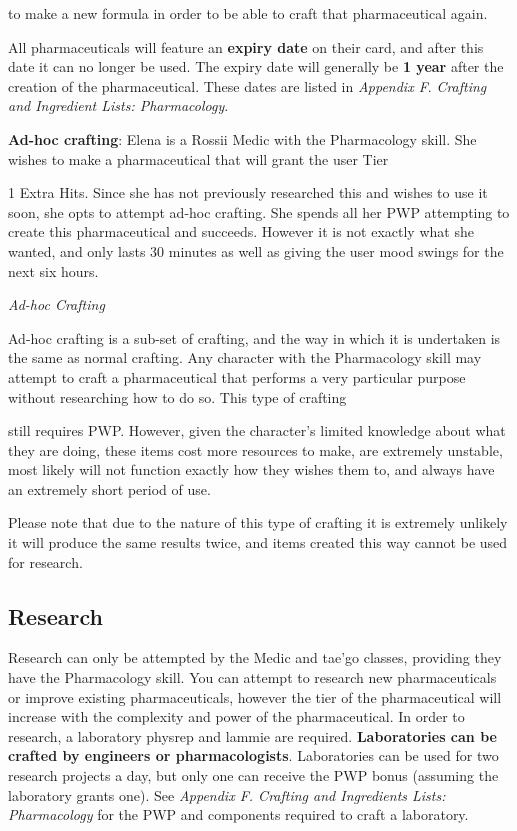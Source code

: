 to make a new formula in order to be able to craft that pharmaceutical again.

All pharmaceuticals will feature an \textbf{expiry date} on their card, and after this date it can no longer be used. The expiry date will generally be \textbf{1 year} after the creation of the pharmaceutical. These dates are listed in \textit{Appendix F}. \textit{Crafting and Ingredient Lists: Pharmacology}.

\textbf{Ad-hoc crafting}: Elena is a Rossii Medic with the Pharmacology skill. She wishes to make a pharmaceutical that will grant the user Tier

1 Extra Hits. Since she has not previously researched this and wishes to use it soon, she opts to attempt ad-hoc crafting. She spends all her PWP attempting to create this pharmaceutical and succeeds. However it is not exactly what she wanted, and only lasts 30 minutes as well as giving the user mood swings for the next six hours.

\textit{Ad-hoc Crafting}

Ad-hoc crafting is a sub-set of crafting, and the way in which it is undertaken is the same as normal crafting. Any character with the Pharmacology skill may attempt to craft a pharmaceutical that performs a very particular purpose without researching how to do so. This type of crafting

still requires PWP. However, given the character's limited knowledge about what they are doing, these items cost more resources to make, are extremely unstable, most likely will not function exactly how they wishes them to, and always have an extremely short period of use.

Please note that due to the nature of this type of crafting it is extremely unlikely it will produce the same results twice, and items created this way cannot be used for research.

\subsection{Research}

Research can only be attempted by the Medic and tae'go classes, providing they have the Pharmacology skill. You can attempt to research new pharmaceuticals or improve existing pharmaceuticals, however the tier of the pharmaceutical will increase with the complexity and power of the pharmaceutical. In order to research, a laboratory physrep and lammie are required. \textbf{Laboratories can be crafted by engineers or pharmacologists}. Laboratories can be used for two research projects a day, but only one can receive the PWP bonus (assuming the laboratory grants one). See \textit{Appendix F. Crafting and Ingredients Lists:} \textit{Pharmacology} for the PWP and components required to craft a laboratory.

